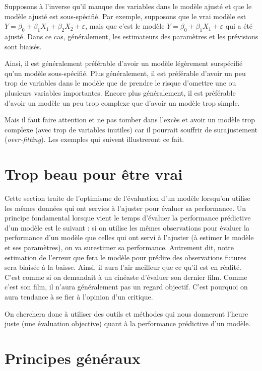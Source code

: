 \documentclass[
]{book}
\theoremstyle{definition}
\theoremstyle{definition}
\theoremstyle{definition}
\theoremstyle{remark}
\begin{document}
Supposons à l'inverse qu'il manque des variables dans le modèle ajusté et que le modèle ajusté est sous-spécifié. Par exemple, supposons que le vrai modèle est \(Y=\beta_0+\beta_1X_1+\beta_2X_2+\varepsilon\), mais que c'est le modèle \(Y=\beta_0+\beta_1X_1+\varepsilon\) qui a été ajusté. Dans ce cas, généralement, les estimateurs des paramètres et les prévisions sont biaisés.

Ainsi, il est généralement préférable d'avoir un modèle légèrement surspécifié qu'un modèle sous-spécifié. Plus généralement, il est préférable d'avoir un peu trop de variables dans le modèle que de prendre le risque d'omettre une ou plusieurs variables importantes. Encore plus généralement, il est préférable d'avoir un modèle un peu trop complexe que d'avoir un modèle trop simple.

Mais il faut faire attention et ne pas tomber dans l'excès et avoir un modèle trop complexe (avec trop de variables inutiles) car il pourrait souffrir de surajustement (\emph{over-fitting}). Les exemples qui suivent illustreront ce fait.

\hypertarget{trop-beau-pour-uxeatre-vrai}{%
\section{Trop beau pour être vrai}\label{trop-beau-pour-uxeatre-vrai}}

Cette section traite de l'optimisme de l'évaluation d'un modèle lorsqu'on utilise les mêmes données qui ont servies à l'ajuster pour évaluer sa performance. Un principe fondamental lorsque vient le temps d'évaluer la performance prédictive d'un modèle est le suivant : si on utilise les mêmes observations pour évaluer la performance d'un modèle que celles qui ont servi à l'ajuster (à estimer le modèle et ses paramètres), on va surestimer sa performance. Autrement dit, notre estimation de l'erreur que fera le modèle pour prédire des observations futures sera biaisée à la baisse. Ainsi, il aura l'air meilleur que ce qu'il est en réalité. C'est comme si on demandait à un cinéaste d'évaluer son dernier film. Comme c'est son film, il n'aura généralement pas un regard objectif. C'est pourquoi on aura tendance à se fier à l'opinion d'un critique.

On cherchera donc à utiliser des outils et méthodes qui nous donneront l'heure juste (une évaluation objective) quant à la performance prédictive d'un modèle.

\hypertarget{principes-guxe9nuxe9raux}{%
\section{Principes généraux}\label{principes-guxe9nuxe9raux}}
\end{document}
